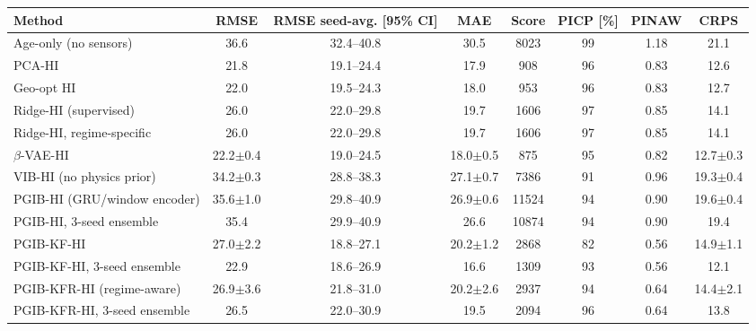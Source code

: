 \setlength{\tabcolsep}{4pt}\begin{tabular}{l c c c c c c c}
\hline
 Method & RMSE & RMSE seed-avg. [95\% CI] & MAE & Score & PICP [\%] & PINAW & CRPS \\
\hline
Age-only (no sensors) & 36.6 & 32.4--40.8 & 30.5 & 8023 & 99 & 1.18 & 21.1 \\
PCA-HI & 21.8 & 19.1--24.4 & 17.9 & 908 & 96 & 0.83 & 12.6 \\
Geo-opt HI & 22.0 & 19.5--24.3 & 18.0 & 953 & 96 & 0.83 & 12.7 \\
Ridge-HI (supervised) & 26.0 & 22.0--29.8 & 19.7 & 1606 & 97 & 0.85 & 14.1 \\
Ridge-HI, regime-specific & 26.0 & 22.0--29.8 & 19.7 & 1606 & 97 & 0.85 & 14.1 \\
$\beta$-VAE-HI & 22.2$\pm$0.4 & 19.0--24.5 & 18.0$\pm$0.5 & 875 & 95 & 0.82 & 12.7$\pm$0.3 \\
VIB-HI (no physics prior) & 34.2$\pm$0.3 & 28.8--38.3 & 27.1$\pm$0.7 & 7386 & 91 & 0.96 & 19.3$\pm$0.4 \\
PGIB-HI (GRU/window encoder) & 35.6$\pm$1.0 & 29.8--40.9 & 26.9$\pm$0.6 & 11524 & 94 & 0.90 & 19.6$\pm$0.4 \\
PGIB-HI, 3-seed ensemble & 35.4 & 29.9--40.9 & 26.6 & 10874 & 94 & 0.90 & 19.4 \\
PGIB-KF-HI & 27.0$\pm$2.2 & 18.8--27.1 & 20.2$\pm$1.2 & 2868 & 82 & 0.56 & 14.9$\pm$1.1 \\
PGIB-KF-HI, 3-seed ensemble & 22.9 & 18.6--26.9 & 16.6 & 1309 & 93 & 0.56 & 12.1 \\
PGIB-KFR-HI (regime-aware) & 26.9$\pm$3.6 & 21.8--31.0 & 20.2$\pm$2.6 & 2937 & 94 & 0.64 & 14.4$\pm$2.1 \\
PGIB-KFR-HI, 3-seed ensemble & 26.5 & 22.0--30.9 & 19.5 & 2094 & 96 & 0.64 & 13.8 \\
\hline
\end{tabular}
